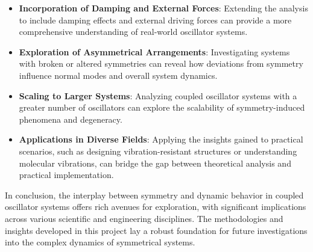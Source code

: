 \documentclass[12pt]{report} %
\begin{document}
\begin{itemize}
    \item \textbf{Incorporation of Damping and External Forces}: Extending the analysis to include damping effects and external driving forces can provide a more comprehensive understanding of real-world oscillator systems.

    \item \textbf{Exploration of Asymmetrical Arrangements}: Investigating systems with broken or altered symmetries can reveal how deviations from symmetry influence normal modes and overall system dynamics.

    \item \textbf{Scaling to Larger Systems}: Analyzing coupled oscillator systems with a greater number of oscillators can explore the scalability of symmetry-induced phenomena and degeneracy.

    \item \textbf{Applications in Diverse Fields}: Applying the insights gained to practical scenarios, such as designing vibration-resistant structures or understanding molecular vibrations, can bridge the gap between theoretical analysis and practical implementation.
\end{itemize}

In conclusion, the interplay between symmetry and dynamic behavior in coupled oscillator systems offers rich avenues for exploration, with significant implications across various scientific and engineering disciplines. The methodologies and insights developed in this project lay a robust foundation for future investigations into the complex dynamics of symmetrical systems.

\newpage
\end{document}
